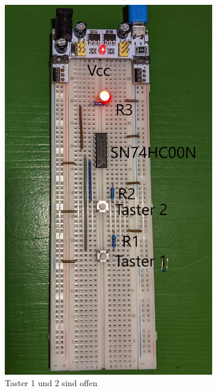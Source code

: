 \documentclass[
    paper=a4,
]{scrartcl}
\begin{document}
    \begin{figure}
        \centering
        \begin{subfigure}[t]{0.3\textwidth}
            \centering
            \includegraphics[width=0.9\linewidth]{Anhang/Bild2.1.jpg}
            \caption{Taster 1 und 2 sind offen}
        \end{subfigure}\hfill%
        \begin{subfigure}[t]{0.3\textwidth}
            \centering

\end{subfigure}
\end{figure}
\end{document}
